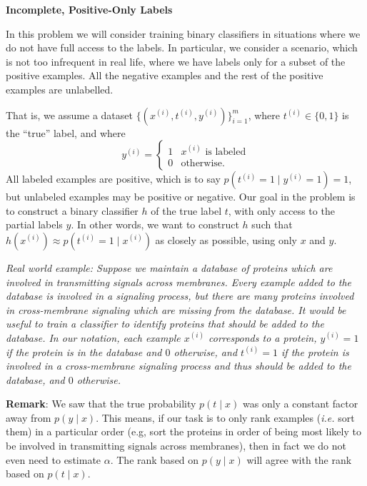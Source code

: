 \clearpage
\item {} {\bf Incomplete, Positive-Only Labels}

In this problem we will consider training binary classifiers in situations
where we do not have full access to the labels. In particular, we consider
a scenario, which is not too infrequent in real life, where we have labels
only for a subset of the positive examples. All the negative examples and
the rest of the positive examples are unlabelled.

That is, we assume a dataset
$\{(x^{(i)}, t^{(i)}, y^{(i)} )\}_{i=1}^m$, where $t^{(i)}\in\{0, 1\}$ is
the ``true'' label, and where
\begin{equation*}
	y^{(i)} =
	\begin{cases} 
		1 & x^{(i)} \text{ is labeled} \\
		0 & \text{otherwise}. 
	\end{cases}
\end{equation*}
All labeled examples are positive, which is to say
$p(t^{(i)} = 1\mid y^{(i)} = 1) = 1$, but unlabeled examples may be positive or
negative. Our goal in the problem is to construct a binary classifier $h$ of
the true label $t$, with only access to the partial labels $y$. In other words,
we want to construct $h$ such that
 $h(x^{(i)}) \approx p(t^{(i)} = 1\mid x^{(i)})$ as closely as
possible, using only $x$ and $y$.

\emph{Real world example: Suppose we maintain a database of proteins which
are involved in transmitting signals across membranes. Every example added to
the database is involved in a signaling process, but there are many proteins
involved in cross-membrane signaling which are missing from the database.
It would be useful to train a classifier to identify proteins that
should be added to the database. In our notation, each example $x^{(i)}$
corresponds to a protein, $y^{(i)} = 1$ if the protein is in the database and
$0$ otherwise, and $t^{(i)} = 1$ if the protein is involved in a cross-membrane
signaling process and thus should be added to the database, and $0$ otherwise.}

\begin{enumerate}
	
	
	
	
	
\end{enumerate}

\textbf{Remark}: We saw that the true probability $p(t\mid x)$ was only a
constant factor away from $p(y\mid x)$. This means, if our task is to only rank
examples (\emph{i.e.} sort them) in a particular order (e.g, sort the proteins
in order of being most likely to be involved in transmitting signals across
membranes), then in fact we do not even need to estimate $\alpha$. The rank
based on $p(y\mid x)$ will agree with the rank based on $p(t\mid x)$.
